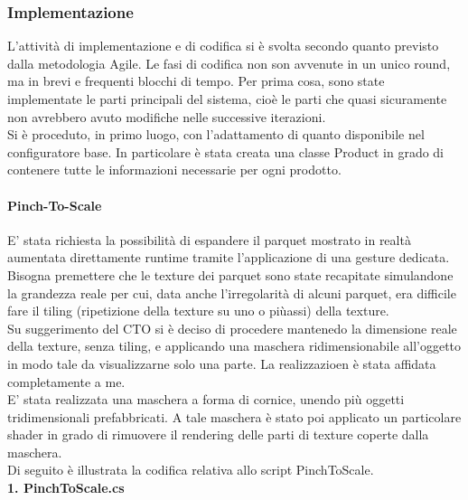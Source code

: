 \subsubsection{Implementazione}
L'attivit\`a di implementazione e di codifica si \`e svolta secondo quanto previsto dalla metodologia Agile. Le fasi di codifica non son avvenute in un unico round, ma in brevi e frequenti blocchi di tempo. Per prima cosa, sono state implementate le parti principali del sistema, cio\`e le parti che quasi sicuramente non avrebbero avuto modifiche nelle successive iterazioni.\\

Si \`e proceduto, in primo luogo, con l'adattamento di quanto disponibile nel configuratore base. In particolare \`e stata creata una classe Product in grado di contenere tutte le informazioni necessarie per ogni prodotto.\\

\paragraph{Pinch-To-Scale}
E' stata richiesta la possibilit\`a di espandere il parquet mostrato in realt\`a aumentata direttamente runtime tramite l'applicazione di una gesture dedicata.\\
Bisogna premettere che le texture dei parquet sono state recapitate simulandone la grandezza reale per cui, data anche l'irregolarit\`a di alcuni parquet, era difficile fare il tiling (ripetizione della texture su uno o pi\`uassi) della texture.\\
Su suggerimento del CTO si \`e deciso di procedere mantenedo la dimensione reale della texture, senza tiling, e applicando una maschera ridimensionabile all'oggetto in modo tale da visualizzarne solo una parte. La realizzazioen \`e stata affidata completamente a me.\\
E' stata realizzata una maschera a forma di cornice, unendo pi\`u oggetti tridimensionali prefabbricati. A tale maschera \`e stato poi applicato un particolare shader in grado di rimuovere il rendering delle parti di texture coperte dalla maschera.\\
Di seguito \`e illustrata la codifica relativa allo script PinchToScale.\\
\noindent
\textbf{1. PinchToScale.cs}

